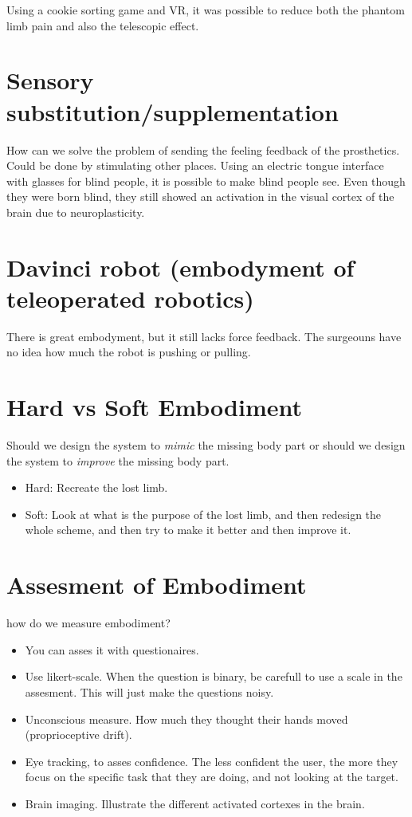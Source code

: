\documentclass[a4paper]{article}
\begin{document}
Using a cookie sorting game and VR, it was possible to reduce both the phantom limb pain and also the telescopic effect. 


\section{Sensory substitution/supplementation}
How can we solve the problem of sending the feeling feedback of the prosthetics. 
Could be done by stimulating other places. Using an electric tongue interface with glasses for blind people, it is possible to make blind people see. Even though they were born blind, they still showed an activation in the visual cortex of the brain due to neuroplasticity.

\section{Davinci robot (embodyment of teleoperated robotics)}
There is great embodyment, but it still lacks force feedback. The surgeouns have no idea how much the robot is pushing or pulling. 

\section{Hard vs Soft Embodiment}
Should we design the system to \textit{mimic} the missing body part or should we design the system to \textit{improve} the missing body part. 

\begin{itemize}
	\item Hard: Recreate the lost limb.
	\item Soft: Look at what is the purpose of the lost limb, and then redesign the whole scheme, and then try to make it better and then improve it. 
\end{itemize}

\section{Assesment of Embodiment}
how do we measure embodiment?
\begin{itemize}
	\item You can asses it with questionaires. 
	\item Use likert-scale. When the question is binary, be carefull to use a scale in the assesment. This will just make the questions noisy.
	\item Unconscious measure. How much they thought their hands moved (proprioceptive drift). 
	\item Eye tracking, to asses confidence. The less confident the user, the more they focus on the specific task that they are doing, and not looking at the target. 
	\item Brain imaging. Illustrate the different activated cortexes in the brain. 
\end{itemize}
\end{document}

